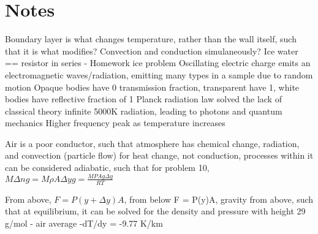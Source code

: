 \documentclass[11 pt, twoside]{article}
\begin{document}
\section{Notes}
Boundary layer is what changes temperature, rather than the wall itself, such that it is what modifies? Convection and conduction simulaneously? Ice water == resistor in series - Homework ice problem
Oscillating electric charge emits an electromagnetic waves/radiation, emitting many types in a sample due to random motion
Opaque bodies have 0 transmission fraction, transparent have 1, white bodies have reflective fraction of 1
Planck radiation law solved the lack of classical theory infinite 5000K radiation, leading to photons and quantum mechanics
Higher frequency peak as temperature increases

Air is a poor conductor, such that atmosphere has chemical change, radiation, and convection (particle flow) for heat change, not conduction, processes within it can be considered adiabatic, such that for problem 10, $M\Delta ng = M\rho A\Delta yg = \frac{MPAg\Delta y}{RT}$

From above, $F = P(y + \Delta y)A$, from below F = P(y)A, gravity from above, such that at equilibrium, it can be solved for the density and pressure with height
29 g/mol - air average
-dT/dy = -9.77 K/km
\end{document}
